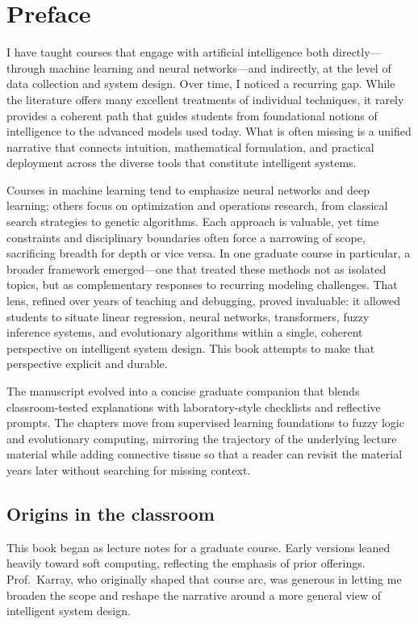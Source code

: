 \section*{Preface}
I have taught courses that engage with artificial intelligence both directly---through machine learning and neural networks---and indirectly, at the level of data collection and system design. Over time, I noticed a recurring gap. While the literature offers many excellent treatments of individual techniques, it rarely provides a coherent path that guides students from foundational notions of intelligence to the advanced models used today. What is often missing is a unified narrative that connects intuition, mathematical formulation, and practical deployment across the diverse tools that constitute intelligent systems.

Courses in machine learning tend to emphasize neural networks and deep learning; others focus on optimization and operations research, from classical search strategies to genetic algorithms. Each approach is valuable, yet time constraints and disciplinary boundaries often force a narrowing of scope, sacrificing breadth for depth or vice versa. In one graduate course in particular, a broader framework emerged---one that treated these methods not as isolated topics, but as complementary responses to recurring modeling challenges. That lens, refined over years of teaching and debugging, proved invaluable: it allowed students to situate linear regression, neural networks, transformers, fuzzy inference systems, and evolutionary algorithms within a single, coherent perspective on intelligent system design. This book attempts to make that perspective explicit and durable.

The manuscript evolved into a concise graduate companion that blends classroom-tested explanations with laboratory-style checklists and reflective prompts. The chapters move from supervised learning foundations to fuzzy logic and evolutionary computing, mirroring the trajectory of the underlying lecture material while adding connective tissue so that a reader can revisit the material years later without searching for missing context.

\subsection*{Origins in the classroom}
This book began as lecture notes for a graduate course. Early versions leaned heavily toward soft computing, reflecting the emphasis of prior offerings. Prof.~Karray, who originally shaped that course arc, was generous in letting me broaden the scope and reshape the narrative around a more general view of intelligent system design.


